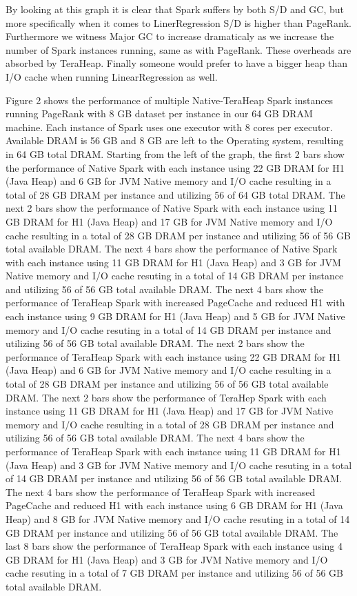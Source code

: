 \documentclass[twocolumn,10pt]{asme2e}
\begin{document}
By looking at this graph it is clear that Spark suffers by both S/D and GC, but more specifically when it comes to LinerRegression S/D is higher than PageRank. Furthermore we witness Major GC to increase dramaticaly as we increase the number of Spark instances running, same as with PageRank. These overheads are absorbed by TeraHeap. Finally someone would prefer to have a bigger heap than I/O cache when running LinearRegression as well.

Figure 2 shows the performance of multiple Native-TeraHeap Spark instances running PageRank with 8 GB dataset per instance in our 64 GB DRAM machine. Each instance of Spark uses one executor with 8 cores per executor. Available DRAM is 56 GB and 8 GB are left to the Operating system, resulting in 64 GB total DRAM. Starting from the left of the graph, the first 2 bars show the performance of Native Spark with each instance using 22 GB DRAM for H1 (Java Heap) and 6 GB for JVM Native memory and I/O cache resulting in a total of 28 GB DRAM per instance and utilizing 56 of 64 GB total DRAM. The next 2 bars show the performance of Native Spark with each instance using 11 GB DRAM for H1 (Java Heap) and 17 GB for JVM Native memory and I/O cache resulting in a total of 28 GB DRAM per instance and utilizing 56 of 56 GB total available DRAM. The next 4 bars show the performance of Native Spark with each instance using 11 GB DRAM for H1 (Java Heap) and 3 GB for JVM Native memory and I/O cache resuting in a total of 14 GB DRAM per instance and utilizing 56 of 56 GB total available DRAM. The next 4 bars show the performance of TeraHeap Spark with increased PageCache and reduced H1 with each instance using 9 GB DRAM for H1 (Java Heap) and 5 GB for JVM Native memory and I/O cache resuting in a total of 14 GB DRAM per instance and utilizing 56 of 56 GB total available DRAM. 
The next 2 bars show the performance of TeraHeap Spark with each instance using 22 GB DRAM for H1 (Java Heap) and 6 GB for JVM Native memory and I/O cache resulting in a total of 28 GB DRAM per instance and utilizing 56 of 56 GB total available DRAM. The next 2 bars show the performance of TeraHep Spark with each instance using 11 GB DRAM for H1 (Java Heap) and 17 GB for JVM Native memory and I/O cache resulting in a total of 28 GB DRAM per instance and utilizing 56 of 56 GB total available DRAM. The next 4 bars show the performance of TeraHeap Spark with each instance using 11 GB DRAM for H1 (Java Heap) and 3 GB for JVM Native memory and I/O cache resuting in a total of 14 GB DRAM per instance and utilizing 56 of 56 GB total available DRAM. The next 4 bars show the performance of TeraHeap Spark with increased PageCache and reduced H1 with each instance using 6 GB DRAM for H1 (Java Heap) and 8 GB for JVM Native memory and I/O cache resuting in a total of 14 GB DRAM per instance and utilizing 56 of 56 GB total available DRAM. The last 8 bars show the performance of TeraHeap Spark with each instance using 4 GB DRAM for H1 (Java Heap) and 3 GB for JVM Native memory and I/O cache resuting in a total of 7 GB DRAM per instance and utilizing 56 of 56 GB total available DRAM.  
\end{document}
